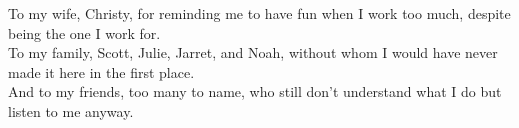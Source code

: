 
\begin{center}
\vspace*{52pt}
To my wife, Christy, for reminding me to have fun when I work too much, despite being the one I work for. \\
To my family, Scott, Julie, Jarret, and Noah, without whom I would have never made it here in the first place. \\
And to my friends, too many to name, who still don't understand what I do but listen to me anyway.
\end{center}

\pagebreak
